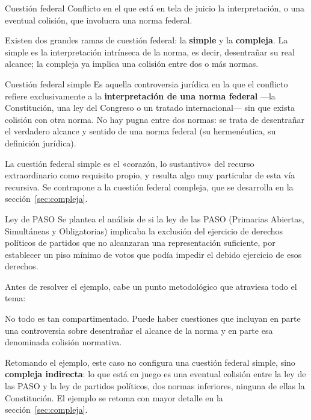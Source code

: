 \documentclass[12pt,oneside]{book}
\begin{document}
\begin{definition}{Cuestión federal}
Conflicto en el que está en tela de juicio la interpretación, o una eventual colisión, que involucra una norma federal.
\end{definition}

Existen dos grandes ramas de cuestión federal: la \textbf{simple} y la \textbf{compleja}. La simple es la interpretación intrínseca de la norma, es decir, desentrañar su real alcance; la compleja ya implica una colisión entre dos o más normas.

\begin{definition}{Cuestión federal simple}
Es aquella controversia jurídica en la que el conflicto refiere exclusivamente a la \textbf{interpretación de una norma federal} —la Constitución, una ley del Congreso o un tratado internacional— sin que exista colisión con otra norma. No hay pugna entre dos normas: se trata de desentrañar el verdadero alcance y sentido de una norma federal (su hermenéutica, su definición jurídica).
\end{definition}

La cuestión federal simple es el «corazón, lo sustantivo» del recurso extraordinario como requisito propio, y resulta algo muy particular de esta vía recursiva. Se contrapone a la cuestión federal compleja, que se desarrolla en la sección~\ref{sec:compleja}.

\begin{example}{Ley de PASO}
Se plantea el análisis de si la ley de las PASO (Primarias Abiertas, Simultáneas y Obligatorias) implicaba la exclusión del ejercicio de derechos políticos de partidos que no alcanzaran una representación suficiente, por establecer un piso mínimo de votos que podía impedir el debido ejercicio de esos derechos.
\end{example}

Antes de resolver el ejemplo, cabe un punto metodológico que atraviesa todo el tema:

\begin{important}
No todo es tan compartimentado. Puede haber cuestiones que incluyan en parte una controversia sobre desentrañar el alcance de la norma y en parte esa denominada colisión normativa.
\end{important}

Retomando el ejemplo, este caso no configura una cuestión federal simple, sino \textbf{compleja indirecta}: lo que está en juego es una eventual colisión entre la ley de las PASO y la ley de partidos políticos, dos normas inferiores, ninguna de ellas la Constitución. El ejemplo se retoma con mayor detalle en la sección~\ref{sec:compleja}.
\end{document}
